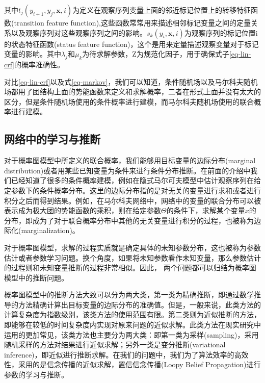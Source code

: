 其中$t_j (y_{i+1}, y_j, \bm{x}, i) $为定义在观察序列变量上面的邻近标记位置上的转移特征函数(transition feature function),这些函数常常用来描述相邻标记变量之间的定量关系以及观察序列对这些观察序列之间的影响。$s_{k}(y_i, \bm{x}, i) $为观察序列的标记位置i的状态特征函数(status feature function)，这个是用来定量描述观察变量对于标记变量的影响。其中$\lambda_j$和$\mu_k$为待求解参数，Z为规范化因子，用于确保式子\ref{eq-lin-crf}的概率准确性。



对比\ref{eq-lin-crf}以及式\ref{eq-markov}，我们可以知道，条件随机场以及马尔科夫随机场都用了团结构上面的势能函数来定义和求解概率，二者在形式上面并没有太大的区分，但是条件随机场使用的条件概率进行建模，而马尔科夫随机场使用的联合概率进行建模。



\subsection{网络中的学习与推断}
对于概率图模型中所定义的联合概率，我们能够用目标变量的边际分布(marginal distribution)或者用某些已知变量为条件来进行条件分布推断。在前面的介绍中我们已经知道了很多的条件概率建模，例如在隐式马尔可夫模型中估计观察序列在给定参数下的条件概率分布。这里的边际分布指的是对无关的变量进行求和或者进行积分之后而得到结果。例如，在马尔科夫网络中，网络中的变量的联合分布可以被表示成为极大团的势能函数的乘积，则在给定参数$\Theta$的条件下，求解某个变量$x$的分布，即成为了对于联合概率分布中其他的无关变量进行积分的过程，也被称为边际化(marginalization)。

对于概率图模型，求解的过程实质就是确定具体的未知参数分布，这也被称为参数估计或者参数学习问题。换个角度，如果将未知参数看作未知变量，那么参数估计的过程则和未知变量推断的过程非常相似。因此， 两个问题都可以归结为概率图模型中的推断问题。

概率图模型中的推断方法大致可以分为两大类，第一类为精确推断，即通过数学推导的方法精确计算出目标变量的边际分布的准确值。但是，一般来说，此类方法的计算复杂度为指数级别，该类方法的使用范围有限。第二类则为近似推断的方法，即能够在较低的时间复杂度内实现对原来问题的近似求解。此类方法在现实研究中运用的更加常见，该类方法也主要分为两大类：即第一类为采样(sampling)，采用随机采样的方法对结果进行近似求解；另外一类是变分推断(variational inference)，即近似进行推断求解。在我们的问题中，我们为了算法效率的高效性，采用的是信念传播的近似求解，置信信念传播(Loopy Belief Propagation)进行参数的学习与推断。











